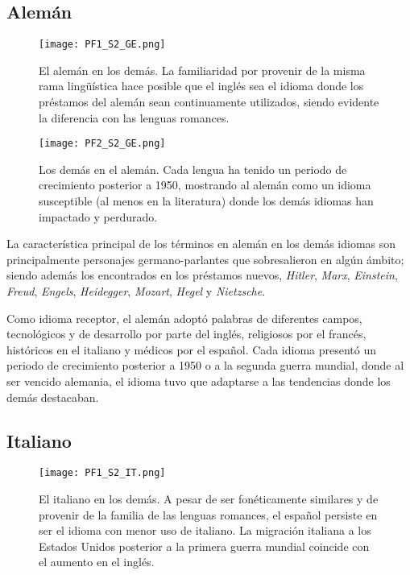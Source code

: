 \subsection{Alemán} %

\begin{figure}[h!]
	\centering
	\texttt{[image: PF1\_S2\_GE.png]}
	\label{fig.ST_a_GE}
	\caption{El alemán en los demás. La familiaridad por provenir de la misma rama lingüística hace posible que el inglés sea el idioma  donde los préstamos del alemán sean continuamente utilizados, siendo evidente la diferencia con las lenguas romances.}

\end{figure}


\begin{figure}[h!]
	\centering
	\texttt{[image: PF2\_S2\_GE.png]}
	\label{fig.ST_b_GE}
	\caption{Los demás en el alemán. Cada lengua ha tenido un periodo de  crecimiento posterior a 1950, mostrando al alemán como un idioma susceptible (al menos en la literatura) donde los demás idiomas han impactado y perdurado.}
\end{figure}




La característica principal de los términos en alemán  en los demás idiomas  son principalmente personajes germano-parlantes que sobresalieron en algún ámbito; siendo además los encontrados en los préstamos nuevos, \textit{Hitler}, \textit{Marx}, \textit{Einstein}, \textit{Freud}, \textit{Engels}, \textit{Heidegger}, \textit{Mozart}, \textit{Hegel} y  \textit{Nietzsche}. 

Como idioma receptor, el alemán adoptó palabras de diferentes campos, tecnológicos y de desarrollo por parte del inglés,  religiosos  por el francés, históricos en el italiano y médicos por el español.  Cada idioma presentó un periodo de crecimiento posterior a 1950  o a la segunda guerra mundial, donde al ser vencido alemania, el idioma tuvo que adaptarse a las tendencias donde los demás destacaban. 

\subsection{Italiano} %

\begin{figure}
	\centering
	\texttt{[image: PF1\_S2\_IT.png]}
	\label{fig.ST_a_IT}
	\caption{El italiano en los demás. A pesar de ser fonéticamente similares y de provenir de la familia de las lenguas romances,  el español persiste en ser el idioma con menor uso de italiano. La migración italiana a los Estados Unidos posterior a la primera guerra mundial coincide con el aumento en el inglés. }
\end{figure}
		

